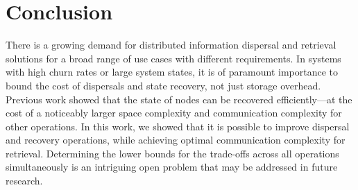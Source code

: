 \documentclass[sigconf,screen]{acmart}
\begin{document}
\section{Conclusion}
\label{sec:conclusion}

There is a growing demand for distributed information dispersal and retrieval solutions for a broad range of use cases with different requirements. 
In systems with high churn rates or large system states, it is of paramount importance to bound the cost of dispersals and state recovery, not just storage overhead. Previous work showed that the state of nodes can be recovered efficiently---at the cost of a noticeably larger space complexity and communication complexity for other operations. In this work, we showed that it is possible to improve dispersal and recovery operations, while achieving optimal communication complexity for retrieval.
Determining the lower bounds for the trade-offs across all operations simultaneously is an intriguing open problem that may be addressed in future research.



\balance

\end{document}
